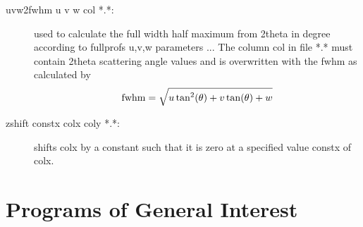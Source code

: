 \begin{description}
\item [\prg uvw2fwhm\label{uvw2fwhm} u v w col *.*:] used to calculate the full
                   width half maximum from
                   2theta in degree according to fullprofs u,v,w parameters ...
                  The column col in file *.* must contain 2theta scattering angle
                 values and is overwritten with the fwhm as calculated by
                  \begin{equation}
                     {\rm  fwhm }= \sqrt {u \tan^2(\theta) + v \tan(\theta) + w}
                \end{equation}
\item [\prg zshift\label{zshift} constx colx coly *.*:] shifts colx by a constant such that it %
is zero at a specified value constx of colx. 
\end{description}

\section{Programs of General Interest}

